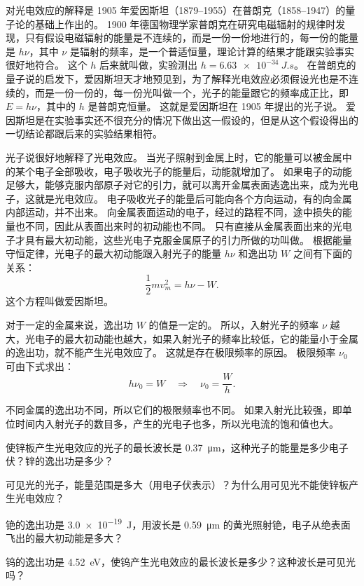 对光电效应的解释是 1905 年爱因斯坦（1879--1955）在普朗克（1858--1947）的量子论的基础上作出的。
1900 年德国物理学家普朗克在研究电磁辐射的规律时发现，只有假设电磁辐射的能量是不连续的，而是一份一份地进行的，每一份的能量是 $h\nu$，其中 $\nu$ 是辐射的频率，是一个普适恒量，理论计算的结果才能跟实验事实很好地符合。
这个 $h$ 后来就叫做，实验测出 $h=\qty{6.63e-34}{J.s}$。
在普朗克的量子说的启发下，爱因斯坦天才地预见到，为了解释光电效应必须假设光也是不连续的，而是一份一份的，每一份光叫做一个，光子的能量跟它的频率成正比，即 $E=h\nu$，其中的 $h$ 是普朗克恒量。
这就是爱因斯坦在 1905 年提出的光子说。
爱因斯坦是在实验事实还不很充分的情况下做出这一假设的，但是从这个假设得出的一切结论都跟后来的实验结果相符。

光子说很好地解释了光电效应。
当光子照射到金属上时，它的能量可以被金属中的某个电子全部吸收，电子吸收光子的能量后，动能就增加了。
如果电子的动能足够大，能够克服内部原子对它的引力，就可以离开金属表面逃逸出来，成为光电子，这就是光电效应。
电子吸收光子的能量后可能向各个方向运动，有的向金属内部运动，并不出来。
向金属表面运动的电子，经过的路程不同，途中损失的能量也不同，因此从表面出来时的初动能也不同。
只有直接从金属表面出来的光电子才具有最大初动能，这些光电子克服金属原子的引力所做的功叫做。
根据能量守恒定律，光电子的最大初动能跟入射光子的能量 $h\nu$ 和逸出功 $W$ 之间有下面的关系：
\[\frac{1}{2}mv^2_m=h\nu-W.\]
这个方程叫做爱因斯坦。

对于一定的金属来说，逸出功 $W$ 的值是一定的。
所以，入射光子的频率 $\nu$ 越大，光电子的最大初动能也越大，如果入射光子的频率比较低，它的能量小于金属的逸出功，就不能产生光电效应了。
这就是存在极限频率的原因。
极限频率 $\nu_0$ 可由下式求出：
\[h\nu_0=W\quad \Rightarrow\quad \nu_0=\frac{W}{h}. \]

不同金属的逸出功不同，所以它们的极限频率也不同。
如果入射光比较强，即单位时间内入射光子的数目多，产生的光电子也多，所以光电流的饱和值也大。

\begin{Practice}
\begin{question}
  \item 使锌板产生光电效应的光子的最长波长是 \qty{0.37}{\micro m}，这种光子的能量是多少电子伏？锌的逸出功是多少？
  \item 可见光的光子，能量范围是多大（用电子伏表示）？为什么用可见光不能使锌板产生光电效应？
  \item 铯的逸出功是 \qty{3.0e-19}{J}，用波长是 \qty{0.59}{\micro m} 的黄光照射铯，电子从绝表面飞出的最大初动能是多大？
  \item 钨的逸出功是 \qty{4.52}{eV}，使钨产生光电效应的最长波长是多少？这种波长是可见光吗？
\end{question}
\end{Practice}

